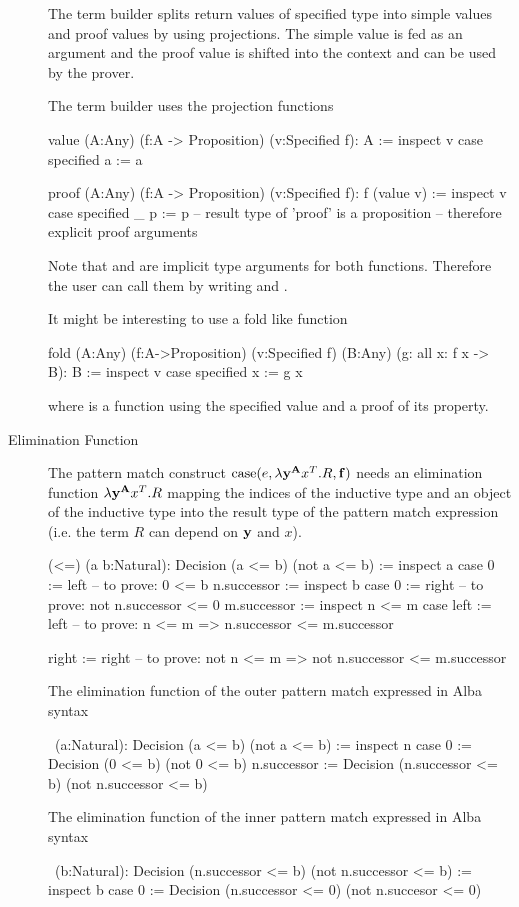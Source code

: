 \begin{description}
  The term builder splits return values of specified type into simple values
  and proof values by using projections. The simple value is fed as an
  argument and the proof value is shifted into the context and can be used by
  the prover.

  The term builder uses the projection functions
  \begin{alba}
     value (A:Any) (f:A -> Proposition) (v:Specified f): A :=
       inspect v case
         specified a := a

     proof (A:Any) (f:A -> Proposition) (v:Specified f): f (value v) :=
       inspect v case
         specified _ p := p   -- result type of 'proof' is a proposition
                              -- therefore explicit proof arguments
  \end{alba}
  Note that  and  are implicit type arguments for both
  functions. Therefore the user can call them by writing  and
  .

  It might be interesting to use a fold like function
  \begin{alba}
     fold (A:Any) (f:A->Proposition) (v:Specified f)
          (B:Any) (g: all x: f x -> B): B :=
       inspect v case
         specified x := g x
  \end{alba}
  where  is a function using the specified value and a proof of its
  property.

\item[Elimination Function]
  The pattern match construct
  $\text{case}(e, \lambda \mathbf{y}^{\mathbf{A}} x^T . R, \mathbf{f})$ needs an elimination
  function $\lambda \mathbf{y}^{\mathbf{A}} x^T . R$ mapping the indices of the
  inductive type and an object of the inductive type into the result type of
  the pattern match expression (i.e. the term $R$ can depend on $\mathbf{y}$ and
  $x$).
  \begin{alba}
     (<=) (a b:Natural): Decision (a <= b) (not a <= b) :=
        inspect a case
          0 :=
            left                 -- to prove: 0 <= b
          n.successor :=
            inspect b case
              0 :=
                right            -- to prove: not n.successor <= 0
              m.successor :=
                inspect n <= m case
                  left  := left
                    -- to prove: n <= m => n.successor <= m.successor

                  right := right
                    -- to prove: not n <= m => not n.successor <= m.successor
  \end{alba}
  The elimination function of the outer pattern match expressed in Alba syntax
  \begin{alba}
    \ (a:Natural): Decision (a <= b) (not a <= b) :=
      inspect n case
        0 :=
          Decision (0 <= b) (not 0 <= b)
        n.successor :=
          Decision (n.successor <= b) (not n.successor <= b)
  \end{alba}
  The elimination function of the inner pattern match expressed in Alba syntax
  \begin{alba}
    \ (b:Natural): Decision (n.successor <= b) (not n.successor <= b) :=
      inspect b case
        0 :=
          Decision (n.successor <= 0) (not n.succesor <= 0)


\end{alba}
\end{description}
